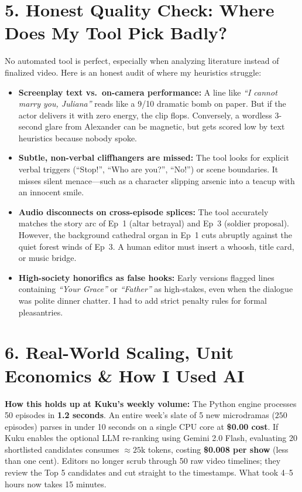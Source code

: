 \documentclass[9.5pt,a4paper]{article}
\begin{document}
\vspace{-2pt}

\section{5. Honest Quality Check: Where Does My Tool Pick Badly?}
No automated tool is perfect, especially when analyzing literature instead of finalized video. Here is an honest audit of where my heuristics struggle:

\begin{itemize}
    \item \textbf{Screenplay text vs.\ on-camera performance:} A line like \textit{``I cannot marry you, Juliana''} reads like a 9/10 dramatic bomb on paper. But if the actor delivers it with zero energy, the clip flops. Conversely, a wordless 3-second glare from Alexander can be magnetic, but gets scored low by text heuristics because nobody spoke.
    \item \textbf{Subtle, non-verbal cliffhangers are missed:} The tool looks for explicit verbal triggers (``Stop!'', ``Who are you?'', ``No!'') or scene boundaries. It misses silent menace---such as a character slipping arsenic into a teacup with an innocent smile.
    \item \textbf{Audio disconnects on cross-episode splices:} The tool accurately matches the story arc of Ep~1 (altar betrayal) and Ep~3 (soldier proposal). However, the background cathedral organ in Ep~1 cuts abruptly against the quiet forest winds of Ep~3. A human editor must insert a whoosh, title card, or music bridge.
    \item \textbf{High-society honorifics as false hooks:} Early versions flagged lines containing \textit{``Your Grace''} or \textit{``Father''} as high-stakes, even when the dialogue was polite dinner chatter. I had to add strict penalty rules for formal pleasantries.
\end{itemize}

\section{6. Real-World Scaling, Unit Economics \& How I Used AI}
\textbf{How this holds up at Kuku's weekly volume:}
The Python engine processes 50 episodes in \textbf{1.2 seconds}. An entire week's slate of 5 new microdramas ($250$ episodes) parses in under 10 seconds on a single CPU core at \textbf{\$0.00 cost}.
If Kuku enables the optional LLM re-ranking using Gemini 2.0 Flash, evaluating 20 shortlisted candidates consumes $\approx 25\text{k}$ tokens, costing \textbf{\$0.008 per show} (less than one cent).
Editors no longer scrub through 50 raw video timelines; they review the Top 5 candidates and cut straight to the timestamps. What took 4--5 hours now takes 15 minutes.
\end{document}
